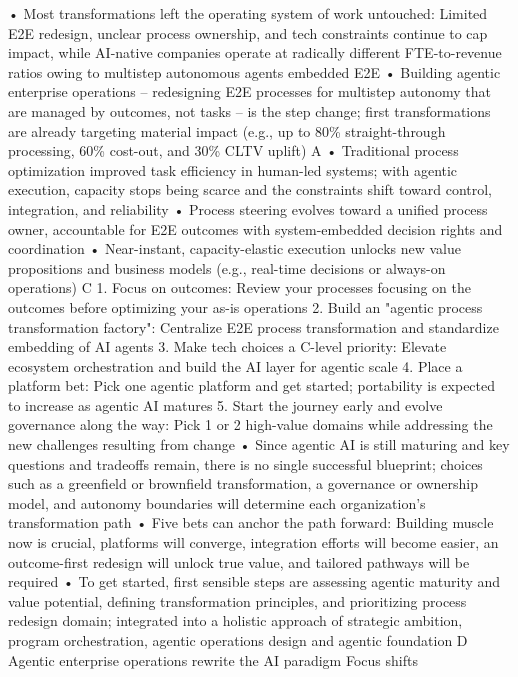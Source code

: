 • Most transformations left the operating system of work untouched: Limited E2E redesign, unclear process ownership, and tech constraints continue to
cap impact, while AI-native companies operate at radically different FTE-to-revenue ratios owing to multistep autonomous agents embedded E2E
• Building agentic enterprise operations – redesigning E2E processes for multistep autonomy that are managed by outcomes, not tasks – is the step
change; first transformations are already targeting material impact (e.g., up to 80\% straight-through processing, 60\% cost-out, and 30\% CLTV uplift)
A
• Traditional process optimization improved task efficiency in human-led systems; with agentic execution, capacity stops being scarce and the constraints
shift toward control, integration, and reliability
• Process steering evolves toward a unified process owner, accountable for E2E outcomes with system-embedded decision rights and coordination
• Near-instant, capacity-elastic execution unlocks new value propositions and business models (e.g., real-time decisions or always-on operations)
C
1. Focus on outcomes: Review your processes focusing on the outcomes before optimizing your as-is operations
2. Build an "agentic process transformation factory": Centralize E2E process transformation and standardize embedding of AI agents
3. Make tech choices a C-level priority: Elevate ecosystem orchestration and build the AI layer for agentic scale
4. Place a platform bet: Pick one agentic platform and get started; portability is expected to increase as agentic AI matures
5. Start the journey early and evolve governance along the way: Pick 1 or 2 high-value domains while addressing the new challenges resulting from change
• Since agentic AI is still maturing and key questions and tradeoffs remain, there is no single successful blueprint; choices such as a greenfield or
brownfield transformation, a governance or ownership model, and autonomy boundaries will determine each organization’s transformation path
• Five bets can anchor the path forward: Building muscle now is crucial, platforms will converge, integration efforts will become easier, an outcome-first
redesign will unlock true value, and tailored pathways will be required
• To get started, first sensible steps are assessing agentic maturity and value potential, defining transformation principles, and prioritizing process redesign
domain; integrated into a holistic approach of strategic ambition, program orchestration, agentic operations design and agentic foundation
D
Agentic
enterprise
operations
rewrite the AI
paradigm
Focus shifts
